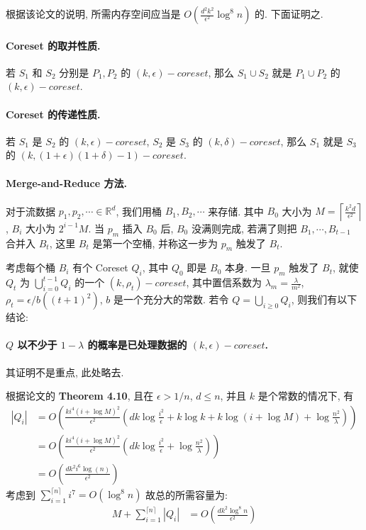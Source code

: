 \documentclass[UTF8]{article}
\begin{document}
根据该论文的说明, 所需内存空间应当是 $O(\frac{d^2k^2}{\epsilon^2}\log^8n)$ 的. 下面证明之.

\paragraph{Coreset 的取并性质.} 若 $S_1$ 和 $S_2$ 分别是 $P_1, P_2$ 的 $(k, \epsilon)-coreset$, 那么 $S_1 \cup S_2$ 就是 $P_1 \cup P_2$ 的 $(k,\epsilon)-coreset$.
\paragraph{Coreset 的传递性质.} 若 $S_1$ 是 $S_2$ 的 $(k, \epsilon)-coreset$, $S_2$ 是 $S_3$ 的 $(k, \delta)-coreset$, 那么 $S_1$ 就是 $S_3$ 的 $(k,(1 + \epsilon)(1+\delta)-1)-coreset$.
\paragraph{Merge-and-Reduce 方法.} 对于流数据 $p_1, p_2, \cdots \in \mathbb{R}^d$, 我们用桶 $B_1, B_2, \cdots$ 来存储. 其中 $B_0$ 大小为 $M=\left\lceil \frac{k^2d}{\epsilon^2} \right\rceil$, $B_i$ 大小为 $2^{i-1}M$. 当 $p_m$ 插入 $B_0$ 后, $B_0$ 没满则完成, 若满了则把 $B_1, \cdots, B_{t-1}$ 合并入 $B_t$, 这里 $B_t$ 是第一个空桶, 并称这一步为 $p_m$ 触发了 $B_t$.

考虑每个桶 $B_i$ 有个 Coreset $Q_i$, 其中 $Q_0$ 即是 $B_0$ 本身. 一旦 $p_m$ 触发了 $B_t$, 就使 $Q_t$ 为 $\bigcup\limits_{i=0}^{t-1}Q_i$ 的一个 $(k,\rho_t)-coreset$, 其中置信系数为 $\lambda_m=\frac{\lambda}{m^2}$, $\rho_{t}=\epsilon /b((t+1)^2)$, $b$ 是一个充分大的常数. 若令 $Q=\bigcup\limits_{i\ge 0} Q_i$, 则我们有以下结论:
\paragraph{$Q$ 以不少于 $1-\lambda$ 的概率是已处理数据的 $(k,\epsilon)-coreset$.} 其证明不是重点, 此处略去.

根据论文的 \textbf{Theorem 4.10}, 且在 $\epsilon > 1/n$, $d \le n$, 并且 $k$ 是个常数的情况下, 有
$$\begin{aligned}
	|Q_i| &= O\left( \frac{k i^4(i+\log M)^2}{\epsilon^2}\left( dk\log\frac{i^2}{\epsilon} + k\log k + k\log(i+\log M) + \log\frac{n^2}{\lambda} \right) \right) \\
	&=O\left( \frac{k i^4(i+\log M)^2}{\epsilon^2}\left( dk\log\frac{i^2}{\epsilon} + \log\frac{n^2}{\lambda} \right) \right) \\
	&=O\left( \frac{dk^2 i^6\log (n)}{\epsilon^2} \right)
\end{aligned}$$
考虑到 $\sum\limits_{i=1}^{\lceil n \rceil}i^7=O(\log^8 n)$
故总的所需容量为:
$$\begin{aligned}
	M + \sum\limits_{i=1}^{\lceil n \rceil}|Q_i| &= O\left( \frac{dk^2 \log ^8 n}{\epsilon^2} \right)
\end{aligned}$$
\end{document}
